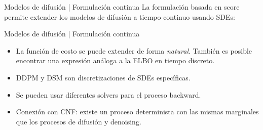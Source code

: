 \documentclass[aspectratio=43, 10pt]{beamer}
\begin{document}
\begin{frame}{Modelos de difusión | Formulación continua}
    La formulación basada en score permite extender los modelos de difusión a tiempo continuo usando SDEs:
\end{frame}

\begin{frame}{Modelos de difusión | Formulación continua}
    \begin{itemize}
        \item<1> La función de costo se puede extender de forma \textit{natural}. También es posible encontrar una expresión análoga a la ELBO en tiempo discreto.
        \item<2> DDPM y DSM son discretizaciones de SDEs específicas.
        \item<3> Se pueden usar diferentes solvers para el proceso backward.
        \item<4> Conexión con CNF: existe un proceso determinista con las mismas marginales que los procesos de difusión y denoising.
    \end{itemize}
\end{frame}
\end{document}
